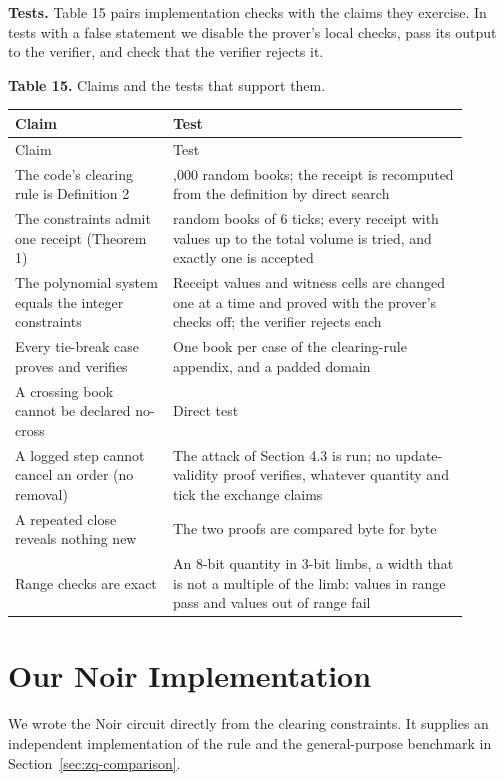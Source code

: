 \textbf{Tests.} Table 15 pairs implementation checks with the claims they exercise. In tests with a false statement we disable the prover's local checks, pass its output to the verifier, and check that the verifier rejects it.

\textbf{Table 15.} Claims and the tests that support them.

\begingroup
\setlength{\tabcolsep}{2pt}\small
\begin{longtable}{@{}>{\raggedright\arraybackslash}p{0.3150\linewidth}>{\raggedright\arraybackslash}p{0.5850\linewidth}@{}}
\toprule
Claim & Test \\
\midrule\endfirsthead
\toprule
Claim & Test \\
\midrule\endhead
\bottomrule\endfoot
The code's clearing rule is Definition 2 & 2,000 random books; the receipt is recomputed from the definition by direct search \\
The constraints admit one receipt (Theorem 1) & 300 random books of 6 ticks; every receipt with values up to the total volume is tried, and exactly one is accepted \\
The polynomial system equals the integer constraints & Receipt values and witness cells are changed one at a time and proved with the prover's checks off; the verifier rejects each \\
Every tie-break case proves and verifies & One book per case of the clearing-rule appendix, and a padded domain \\
A crossing book cannot be declared no-cross & Direct test \\
A logged step cannot cancel an order (no removal) & The attack of Section 4.3 is run; no update-validity proof verifies, whatever quantity and tick the exchange claims \\
A repeated close reveals nothing new & The two proofs are compared byte for byte \\
Range checks are exact & An 8-bit quantity in 3-bit limbs, a width that is not a multiple of the limb: values in range pass and values out of range fail \\
\end{longtable}
\endgroup

\section{Our Noir Implementation}
\label{app:zq-noir}

We wrote the Noir circuit directly from the clearing constraints. It supplies an independent implementation of the rule and the general-purpose benchmark in Section~\ref{sec:zq-comparison}.

